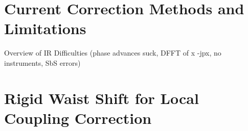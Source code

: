 
\section{Current Correction Methods and Limitations}

Overview of IR Difficulties (phase advances suck, DFFT of x -jpx, no instruments, SbS errors)










\section{Rigid Waist Shift for Local Coupling Correction}

